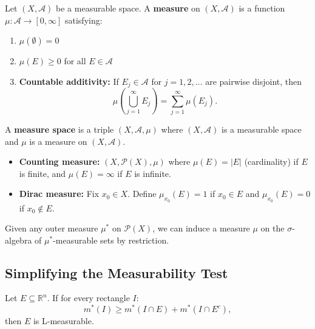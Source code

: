 \documentclass[11pt]{report}
\begin{document}
\begin{defbox}[Measure]
Let $(X, \mathcal{A})$ be a measurable space. A \textbf{measure} on $(X, \mathcal{A})$ is a function $\mu: \mathcal{A} \to [0, \infty]$ satisfying:
\begin{enumerate}
    \item $\mu(\emptyset) = 0$
    \item $\mu(E) \geq 0$ for all $E \in \mathcal{A}$
    \item \textbf{Countable additivity:} If $E_j \in \mathcal{A}$ for $j = 1, 2, \ldots$ are pairwise disjoint, then
    \[
    \mu\left( \bigcup_{j=1}^{\infty} E_j \right) = \sum_{j=1}^{\infty} \mu(E_j).
    \]
\end{enumerate}
\end{defbox}

\begin{defbox}
A \textbf{measure space} is a triple $(X, \mathcal{A}, \mu)$ where $(X, \mathcal{A})$ is a measurable space and $\mu$ is a measure on $(X, \mathcal{A})$.
\end{defbox}

\begin{exbox}
\begin{itemize}
    \item \textbf{Counting measure:} $(X, \mathcal{P}(X), \mu)$ where $\mu(E) = |E|$ (cardinality) if $E$ is finite, and $\mu(E) = \infty$ if $E$ is infinite.
    \item \textbf{Dirac measure:} Fix $x_0 \in X$. Define $\mu_{x_0}(E) = 1$ if $x_0 \in E$ and $\mu_{x_0}(E) = 0$ if $x_0 \notin E$.
\end{itemize}
\end{exbox}

\begin{propbox}
Given any outer measure $\mu^*$ on $\mathcal{P}(X)$, we can induce a measure $\mu$ on the $\sigma$-algebra of $\mu^*$-measurable sets by restriction.
\end{propbox}

\subsection{Simplifying the Measurability Test}

\begin{propbox}
Let $E \subseteq \mathbb{R}^n$. If for every rectangle $I$:
\[
m^*(I) \geq m^*(I \cap E) + m^*(I \cap E^c),
\]
then $E$ is L-measurable.
\end{propbox}
\end{document}

